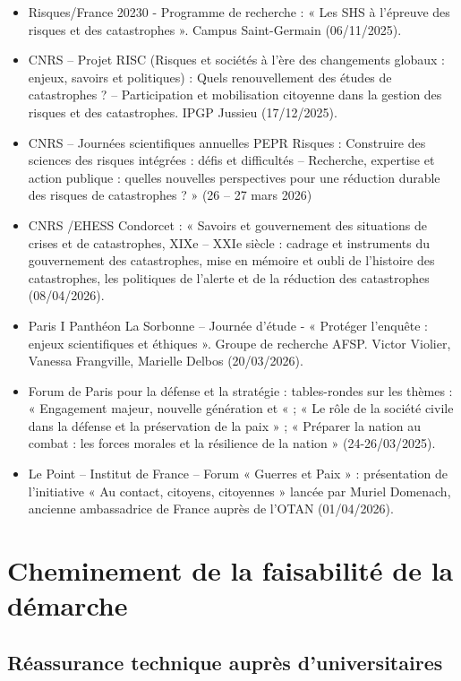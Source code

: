 \documentclass[10pt,a4paper]{article}
\begin{document}
\begin{itemize}
\item Risques/France 20230 - Programme de recherche : « Les SHS à l'épreuve des risques et des catastrophes ». Campus Saint-Germain (06/11/2025).
\item CNRS -- Projet RISC (Risques et sociétés à l'ère des changements globaux : enjeux, savoirs et politiques) : Quels renouvellement des études de catastrophes ? -- Participation et mobilisation citoyenne dans la gestion des risques et des catastrophes. IPGP Jussieu (17/12/2025).
\item CNRS -- Journées scientifiques annuelles PEPR Risques : Construire des sciences des risques intégrées : défis et difficultés -- Recherche, expertise et action publique : quelles nouvelles perspectives pour une réduction durable des risques de catastrophes ? » (26 -- 27 mars 2026)
\item CNRS /EHESS Condorcet : « Savoirs et gouvernement des situations de crises et de catastrophes, XIXe -- XXIe siècle : cadrage et instruments du gouvernement des catastrophes, mise en mémoire et oubli de l'histoire des catastrophes, les politiques de l'alerte et de la réduction des catastrophes (08/04/2026).
\item Paris I Panthéon La Sorbonne -- Journée d'étude - « Protéger l'enquête : enjeux scientifiques et éthiques ». Groupe de recherche AFSP. Victor Violier, Vanessa Frangville, Marielle Delbos (20/03/2026).
\item Forum de Paris pour la défense et la stratégie :  tables-rondes sur les thèmes : « Engagement majeur, nouvelle génération et «  ; « Le rôle de la société civile dans la défense et la préservation de la paix » ; « Préparer la nation au combat : les forces morales et la résilience de la nation » (24-26/03/2025).
\item Le Point -- Institut de France -- Forum « Guerres et Paix » : présentation de l'initiative « Au contact, citoyens, citoyennes » lancée par Muriel Domenach, ancienne ambassadrice de France auprès de l'OTAN (01/04/2026).
\end{itemize}

\section{Cheminement de la faisabilité de la démarche}

\subsection{Réassurance technique auprès d'universitaires}
\end{document}
